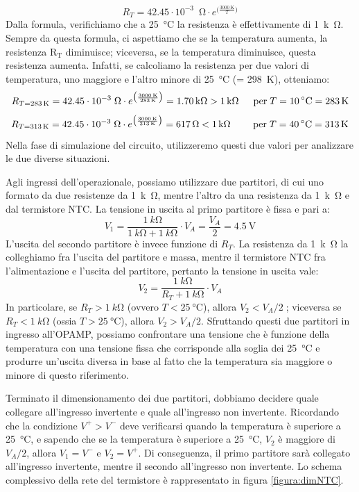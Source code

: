 \documentclass{report}
\begin{document}
$$R_T = 42.45\cdot 10^{-3}\;\SI{}{\ohm}\cdot e^{\bigl(\frac{\SI{3000}{\kelvin}}{T}\bigr)} $$
Dalla formula, verifichiamo che a \SI{25}{\celsius} la resistenza è effettivamente di \SI{1}{k\ohm}. Sempre da questa formula, ci aspettiamo che se la temperatura aumenta, la resistenza $\mathrm{R_T}$ diminuisce; viceversa, se la temperatura diminuisce, questa resistenza aumenta. Infatti, se calcoliamo la resistenza per due valori di temperatura, uno maggiore e l'altro minore di \SI{25}{\celsius} (= \SI{298}{\kelvin}), otteniamo:
$$R_{T=\SI{283}{\kelvin}} = 42.45\cdot 10^{-3}\;\SI{}{\ohm}\cdot e^{\bigl(\frac{\SI{3000}{\kelvin}}{\SI{283}{\kelvin}}\bigr)}=\SI{1.70}{k\ohm}>\SI{1}{k\ohm}\indent\mathrm{per \;}T = \SI{10}{\celsius}=\SI{283}{\kelvin}$$
$$R_{T=\SI{313}{\kelvin}} = 42.45\cdot 10^{-3}\;\SI{}{\ohm}\cdot e^{\bigl(\frac{\SI{3000}{\kelvin}}{\SI{313}{\kelvin}}\bigr)}=\SI{617}{\ohm}<\SI{1}{k\ohm}\;\;\;\indent\mathrm{per \;}T = \SI{40}{\celsius}=\SI{313}{\kelvin}$$
Nella fase di simulazione del circuito, utilizzeremo questi due valori per analizzare le due diverse situazioni. \par
Agli ingressi dell'operazionale, possiamo utilizzare due partitori, di cui uno formato da due resistenze da \SI{1}{k\ohm}, mentre l'altro da una resistenza da \SI{1}{k\ohm} e dal termistore NTC. La tensione in uscita al primo partitore è fissa e pari a:
$$V_1 = \frac{\SI{1}{k\ohm}}{\SI{1}{k\ohm}+\SI{1}{k\ohm}}\cdot V_A = \frac{V_A}{2} = \SI{4.5}{\volt}$$
L'uscita del secondo partitore è invece funzione di $R_T$. La resistenza da \SI{1}{k\ohm} la colleghiamo fra l'uscita del partitore e massa, mentre il termistore NTC fra l'alimentazione e l'uscita del partitore, pertanto la tensione in uscita vale:
$$V_2 = \frac{\SI{1}{k\ohm}}{R_T+\SI{1}{k\ohm}}\cdot V_A$$
In particolare, se $R_T>\SI{1}{k\ohm}$ (ovvero $T<\SI{25}{\celsius}$), allora $V_2<V_A/2\;$; viceversa se $R_T<\SI{1}{k\ohm}$ (ossia $T>\SI{25}{\celsius}$), allora $V_2>V_A/2$. Sfruttando questi due partitori in ingresso all'OPAMP, possiamo confrontare una tensione che è funzione della temperatura con una tensione fissa che corrisponde alla soglia dei \SI{25}{\celsius} e produrre un'uscita diversa in base al fatto che la temperatura sia maggiore o minore di questo riferimento. \par
Terminato il dimensionamento dei due partitori, dobbiamo decidere quale collegare all'ingresso invertente e quale all'ingresso non invertente. Ricordando che la condizione $V^+>V^-$ deve verificarsi quando la temperatura è superiore a \SI{25}{\celsius}, e sapendo che se la temperatura è superiore a \SI{25}{\celsius}, $V_2$ è maggiore di $V_A/2$, allora $V_1=V^-$ e $V_2=V^+$. Di conseguenza, il primo partitore sarà collegato all'ingresso invertente, mentre il secondo all'ingresso non invertente. Lo schema complessivo della rete del termistore è rappresentato in figura \ref{figura:dimNTC}. \par
\end{document}
